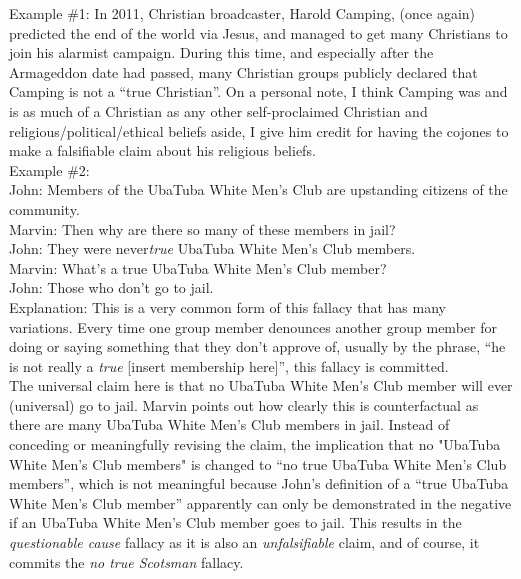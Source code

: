 \documentclass[a4paper,12pt,single,pdftex]{scrbook}
\begin{document}
    
      Example \#1: In 2011, Christian broadcaster, Harold Camping, (once again) predicted the end of the world via Jesus, and managed to get many Christians to join his alarmist campaign.  During this time, and especially after the Armageddon date had passed,  many Christian groups publicly declared that Camping is not a “true Christian”.  On a personal note, I think Camping was and is as much of a Christian as any other self-proclaimed Christian and religious/political/ethical beliefs aside, I give him credit for having the cojones to make a falsifiable claim about his religious beliefs.
    \\

    
      Example \#2:
    \\

    
      John: Members of the UbaTuba White Men's Club are upstanding citizens of the community.
    \\

    
      Marvin: Then why are there so many of these members in jail?
    \\

    
      John: They were never{\it  true} UbaTuba White Men's Club members.
    \\

    
      Marvin: What’s a true UbaTuba White Men's Club member?
    \\

    
      John: Those who don't go to jail.
    \\

    
      Explanation: This is a very common form of this fallacy that has many variations.  Every time one group member denounces another group member for doing or saying something that they don’t approve of, usually by the phrase, “he is not really a {\it true} [insert membership here]”, this fallacy is committed.
    \\

    
      The universal claim here is that no UbaTuba White Men's Club member will ever (universal) go to jail.  Marvin points out how clearly this is counterfactual as there are many UbaTuba White Men's Club members in jail.  Instead of conceding or meaningfully revising the claim, the implication that no "UbaTuba White Men's Club members" is changed to “no true UbaTuba White Men's Club members”, which is not meaningful because John’s definition of a “true UbaTuba White Men's Club member” apparently can only be demonstrated in the negative if an UbaTuba White Men's Club member goes to jail.  This results in the {\it questionable cause} fallacy as it is also an {\it unfalsifiable} claim, and of course, it commits the {\it no true Scotsman} fallacy.
    \\
\end{document}
